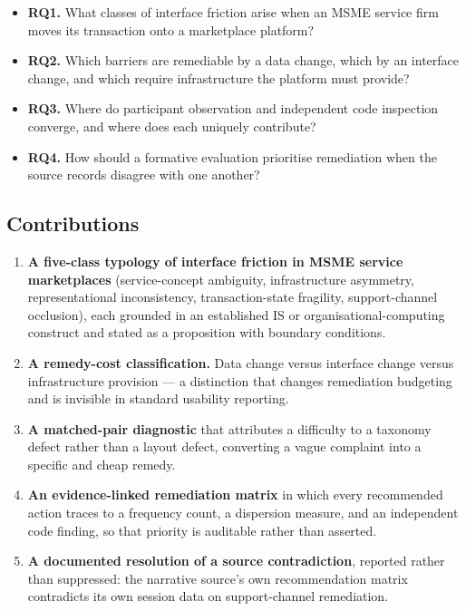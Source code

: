 \documentclass[]{interact}
\theoremstyle{plain}
\begin{document}
\begin{itemize}
\item \textbf{RQ1.} What classes of interface friction arise when an MSME service firm moves its
      transaction onto a marketplace platform?
\item \textbf{RQ2.} Which barriers are remediable by a data change, which by an interface change, and
      which require infrastructure the platform must provide?
\item \textbf{RQ3.} Where do participant observation and independent code inspection converge, and where
      does each uniquely contribute?
\item \textbf{RQ4.} How should a formative evaluation prioritise remediation when the source records
      disagree with one another?
\end{itemize}

\subsection{Contributions}

\begin{enumerate}
\item \textbf{A five-class typology of interface friction in MSME service marketplaces} (service-concept
      ambiguity, infrastructure asymmetry, representational inconsistency, transaction-state fragility,
      support-channel occlusion), each grounded in an established IS or organisational-computing
      construct and stated as a proposition with boundary conditions.
\item \textbf{A remedy-cost classification.} Data change versus interface change versus infrastructure
      provision --- a distinction that changes remediation budgeting and is invisible in standard
      usability reporting.
\item \textbf{A matched-pair diagnostic} that attributes a difficulty to a taxonomy defect rather than a
      layout defect, converting a vague complaint into a specific and cheap remedy.
\item \textbf{An evidence-linked remediation matrix} in which every recommended action traces to a
      frequency count, a dispersion measure, and an independent code finding, so that priority is
      auditable rather than asserted.
\item \textbf{A documented resolution of a source contradiction}, reported rather than suppressed: the
      narrative source's own recommendation matrix contradicts its own session data on support-channel
      remediation.
\end{enumerate}
\end{document}
